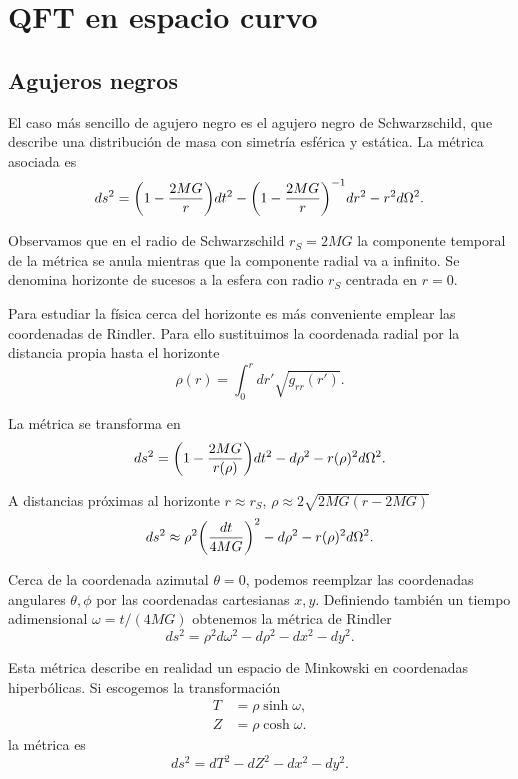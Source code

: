 \chapter{QFT en espacio curvo}

\section{Agujeros negros}
El caso más sencillo de agujero negro es el agujero negro de Schwarzschild, que
describe una distribución de masa con simetría esférica y estática. La métrica asociada
es 
\begin{equation}
  ds^2= \qty(1-\frac{2MG}{r})dt^2-\qty(1-\frac{2MG}{r})^{-1}dr^2-r^2d\Omega^2.
\end{equation}

Observamos que en el radio de Schwarzschild $r_S=2MG$ la componente temporal de la 
métrica se anula mientras que la componente radial va a infinito.
Se denomina horizonte de sucesos a la esfera con radio $r_S$ centrada en $r=0$.

Para estudiar la física cerca del horizonte es más conveniente emplear las coordenadas
de Rindler. Para ello sustituimos la coordenada radial por la distancia propia hasta
el horizonte
\begin{equation}
  \rho(r)=\int_0^r dr' \sqrt{g_{rr}(r')}.
\end{equation}

La métrica se transforma en 
\begin{equation}
  ds^2=\qty(1-\frac{2MG}{r(\rho)})dt^2-d\rho^2-r(\rho)^2d\Omega^2.
\end{equation}

A distancias próximas al horizonte $r\approx r_S$, $\rho\approx 2\sqrt{2MG(r-2MG)}$
\begin{equation}
  ds^2\approx \rho^2\qty(\frac{dt}{4MG})^2 -d\rho^2-r(\rho)^2d\Omega^2.
\end{equation}

Cerca de la coordenada azimutal $\theta=0$, podemos reemplzar las coordenadas
angulares $\theta,\phi$ por las coordenadas cartesianas $x,y$. Definiendo
también un tiempo adimensional $\omega=t/(4MG)$ obtenemos la métrica de Rindler
\begin{equation}
  ds^2=\rho^2d\omega^2 -d\rho^2 -dx^2-dy^2.
\end{equation}

Esta métrica describe en realidad un espacio de Minkowski en coordenadas hiperbólicas.
Si escogemos la transformación
\begin{align}
  T&=\rho \sinh \omega, \\
  Z&=\rho \cosh \omega.
\end{align}
la métrica es
\begin{equation}
  ds^2=dT^2-dZ^2-dx^2-dy^2.
\end{equation}

